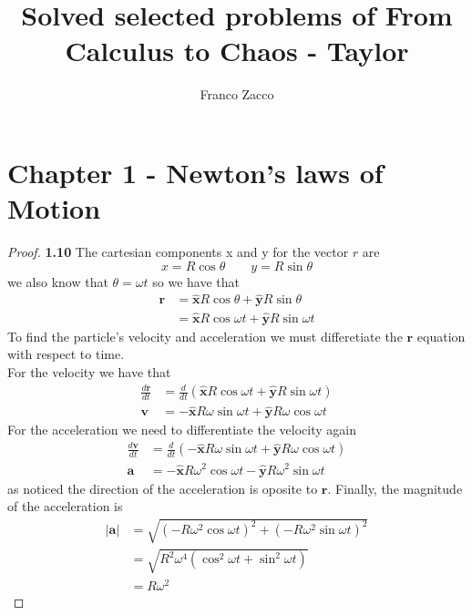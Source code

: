 \documentclass[11pt]{article}
\title{\textbf{Solved selected problems of From Calculus to Chaos - Taylor}}
\author{Franco Zacco}
\date{}
\newcommand{\hatx}{\bm{\hat{x}}}
\newcommand{\haty}{\bm{\hat{y}}}
\begin{document}
\maketitle
\thispagestyle{empty}

\section*{Chapter 1 - Newton's laws of Motion}

	\begin{proof}{\textbf{1.10}}
        The cartesian components x and y for the vector $r$ are 
        $$x = R \cos{\theta} \quad\quad y = R \sin{\theta}$$
        we also know that $\theta = \omega t$
        so we have that
        \begin{align*}
            \bm{r} &= \hatx R \cos{\theta}  + \haty R \sin{\theta} \\
                   &= \hatx R \cos{\omega t} + \haty R \sin{\omega t}
        \end{align*}
        To find the particle's velocity and acceleration we must differetiate
        the $\bm{r}$ equation with respect to time.\\
        For the velocity we have that 
        \begin{align*}
            \frac{d\bm{r}}{dt} &= \frac{d}{dt}(\hatx R \cos{\omega t}  + \haty R \sin{\omega t}) \\
                        \bm{v} &= - \hatx R \omega \sin{\omega t} + \haty R \omega \cos{\omega t}
        \end{align*}
        For the acceleration we need to differentiate the velocity again 
        \begin{align*}
            \frac{d\bm{v}}{dt} &= \frac{d}{dt}(- \hatx R \omega \sin{\omega t} + \haty R \omega \cos{\omega t}) \\
                        \bm{a} &= - \hatx R \omega^2 \cos{\omega t} - \haty R \omega^2 \sin{\omega t}
        \end{align*}
        as noticed the direction of the acceleration is oposite to $\bm{r}$.
        Finally, the magnitude of the acceleration is
        \begin{align*}
            |\bm{a}| &= \sqrt{(-R \omega^2 \cos{\omega t})^2 + (-R \omega^2 \sin{\omega t})^2} \\
                     &= \sqrt{R^2 \omega^4(\cos^2{\omega t} + \sin^2{\omega t})} \\
                     &= R \omega^2
        \end{align*}
        \end{proof}
\end{document}
